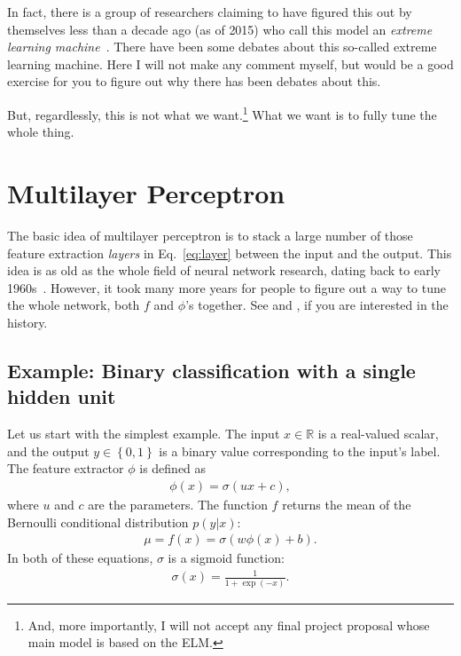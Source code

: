 \documentclass{report}
\newcommand{\RR}[0]{\mathbb{R}}
\begin{document}
In fact, there is a group of researchers claiming to have figured this out by
themselves less than a decade ago (as of 2015) who call this model an {\em
extreme learning machine}~\cite{Huang2006}. There have been some debates about
this so-called extreme learning machine. Here I will not make any comment
myself, but would be a good exercise for you to figure out why there has been
debates about this.

But, regardlessly, this is not what we want.\footnote{
    And, more importantly, I will not accept any final project proposal whose
    main model is based on the ELM.
}
What we want is to fully tune the whole thing.

\section{Multilayer Perceptron}
\label{sec:mlp}

The basic idea of multilayer perceptron is to stack a large number of those
feature extraction {\em layers} in Eq.~\eqref{eq:layer} between the input and
the output. This idea is as old as the whole field of neural network research,
dating back to early 1960s~\cite{Rosenblatt1962}. However, it took many more
years for people to figure out a way to tune the whole network, both $f$ and
$\phi$'s together. See \cite{schmidhuber2015deep} and \cite{lecun2015deep}, if you
are interested in the history.

\subsection{Example: Binary classification with a single hidden unit}

Let us start with the simplest example. The input $x \in \RR$ is a real-valued
scalar, and the output $y \in \left\{0,1\right\}$ is a binary value
corresponding to the input's label. The feature extractor $\phi$ is defined as
\begin{align}
    \label{eq:phi}
    \phi(x) = \sigma(u x + c),
\end{align}
where $u$ and $c$ are the parameters. The function $f$ returns the mean of the
Bernoulli conditional distribution $p(y|x)$:
\begin{align}
    \label{eq:f}
    \mu = f(x) = \sigma(w \phi(x) + b).
\end{align}
In both of these equations, $\sigma$ is a sigmoid function:
\begin{align}
    \label{eq:sigmoid}
    \sigma(x) = \frac{1}{1+\exp(-x)}.
\end{align}
\end{document}
